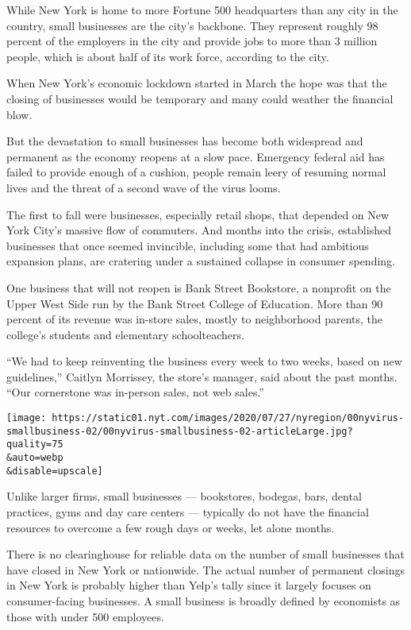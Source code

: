 While New York is home to more Fortune 500 headquarters than any city in
the country, small businesses are the city's backbone. They represent
roughly 98 percent of the employers in the city and provide jobs to more
than 3 million people, which is about half of its work force, according
to the city.

When New York's economic lockdown started in March the hope was that the
closing of businesses would be temporary and many could weather the
financial blow.

But the devastation to small businesses has become both widespread and
permanent as the economy reopens at a slow pace. Emergency federal aid
has failed to provide enough of a cushion, people remain leery of
resuming normal lives and the threat of a second wave of the virus
looms.

The first to fall were businesses, especially retail shops, that
depended on New York City's massive flow of commuters. And months into
the crisis, established businesses that once seemed invincible,
including some that had ambitious expansion plans, are cratering under a
sustained collapse in consumer spending.

One business that will not reopen is Bank Street Bookstore, a nonprofit
on the Upper West Side run by the Bank Street College of Education. More
than 90 percent of its revenue was in-store sales, mostly to
neighborhood parents, the college's students and elementary
schoolteachers.

``We had to keep reinventing the business every week to two weeks, based
on new guidelines,'' Caitlyn Morrissey, the store's manager, said about
the past months. ``Our cornerstone was in-person sales, not web sales.''

\texttt{[image: https://static01.nyt.com/images/2020/07/27/nyregion/00nyvirus-smallbusiness-02/00nyvirus-smallbusiness-02-articleLarge.jpg?quality=75\\\&auto=webp\\\&disable=upscale]}

Unlike larger firms, small businesses --- bookstores, bodegas, bars,
dental practices, gyms and day care centers --- typically do not have
the financial resources to overcome a few rough days or weeks, let alone
months.

There is no clearinghouse for reliable data on the number of small
businesses that have closed in New York or nationwide. The actual number
of permanent closings in New York is probably higher than Yelp's tally
since it largely focuses on consumer-facing businesses. A small business
is broadly defined by economists as those with under 500 employees.

